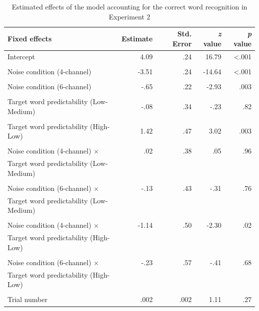 \documentclass[a4paper, nobind]{templates/ociamthesis}
\begin{document}
\begin{table}[ht]
\begin{center}
\caption{Estimated effects of the model accounting for the correct word recognition in Experiment 2}
\label{results1b} 
\vskip 0.12in
\begin{tabular}[]{@{}lrrrr@{}}
\toprule
Fixed effects & Estimate & Std. Error & \emph{z} value & \emph{p}
value \\
\midrule
Intercept & 4.09 & .24 & 16.79 & \textless.001 \\
\\
Noise condition (4-channel) & -3.51 & .24 & -14.64 & \textless.001 \\
\\
Noise condition (6-channel) & -.65 & .22 & -2.93 & .003 \\
\\
Target word predictability (Low-Medium) & -.08 & .34 & -.23 & .82 \\
\\
Target word predictability (High-Low) & 1.42 & .47 & 3.02 & .003 \\
\\
Noise condition (4-channel) $\times$ & .02 & .38 & .05 & .96 \\
Target word predictability (Low-Medium) \\
\\
Noise condition (6-channel) $\times$ & -.13 & .43 & -.31 & .76 \\
Target word predictability (Low-Medium) \\
\\
Noise condition (4-channel) $\times$ & -1.14 & .50 & -2.30 & .02 \\
Target word predictability (High-Low) \\
\\
Noise condition (6-channel) $\times$ & -.23 & .57 & -.41 & .68 \\
Target word predictability (High-Low) \\
\\
Trial number & .002 & .002 & 1.11 & .27 \\
\bottomrule
\end{tabular} 
\end{center} 
\end{table}
\end{document}

